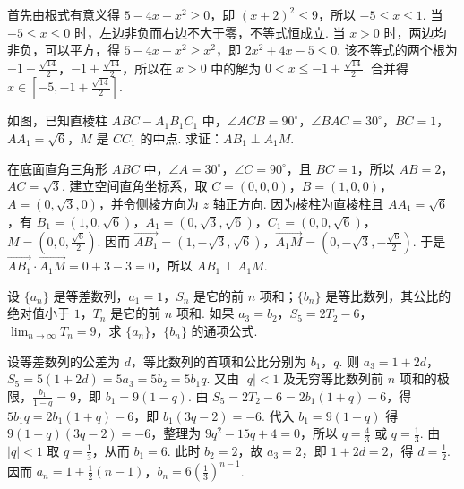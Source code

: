 \documentclass[UTF8,a4paper,oneside,11pt]{ctexbook}
\begin{document}
\begin{solution}
首先由根式有意义得 \(5-4x-x^2\geqslant0\)，即 \((x+2)^2\leqslant9\)，所以 \(-5\leqslant x\leqslant1\). 当 \(-5\leqslant x\leqslant0\) 时，左边非负而右边不大于零，不等式恒成立. 当 \(x>0\) 时，两边均非负，可以平方，得 \(5-4x-x^2\geqslant x^2\)，即 \(2x^2+4x-5\leqslant0\). 该不等式的两个根为 \(-1-\frac{\sqrt{14}}{2}\)，\(-1+\frac{\sqrt{14}}{2}\)，所以在 \(x>0\) 中的解为 \(0<x\leqslant-1+\frac{\sqrt{14}}{2}\). 合并得 \(x\in\left[-5,-1+\frac{\sqrt{14}}{2}\right]\).
\end{solution}

\begin{problem}
如图，已知直棱柱 \(ABC-A_1B_1C_1\) 中，\(\angle ACB=90^{\circ}\)，\(\angle BAC=30^{\circ}\)，\(BC=1\)，\(AA_1=\sqrt{6}\)，\(M\) 是 \(CC_1\) 的中点. 求证：\(AB_1\perp A_1M\).

\end{problem}

\begin{solution}
在底面直角三角形 \(ABC\) 中，\(\angle A=30^{\circ}\)，\(\angle C=90^{\circ}\)，且 \(BC=1\)，所以 \(AB=2\)，\(AC=\sqrt{3}\). 建立空间直角坐标系，取 \(C=(0,0,0)\)，\(B=(1,0,0)\)，\(A=(0,\sqrt{3},0)\)，并令侧棱方向为 \(z\) 轴正方向. 因为棱柱为直棱柱且 \(AA_1=\sqrt{6}\)，有 \(B_1=(1,0,\sqrt{6})\)，\(A_1=(0,\sqrt{3},\sqrt{6})\)，\(C_1=(0,0,\sqrt{6})\)，\(M=\left(0,0,\frac{\sqrt{6}}{2}\right)\). 因而
\(\overrightarrow{AB_1}=(1,-\sqrt{3},\sqrt{6})\)，\(\overrightarrow{A_1M}=\left(0,-\sqrt{3},-\frac{\sqrt{6}}{2}\right)\). 于是 \(\overrightarrow{AB_1}\cdot\overrightarrow{A_1M}=0+3-3=0\)，所以 \(AB_1\perp A_1M\).
\end{solution}

\begin{problem}
设 \(\{a_n\}\) 是等差数列，\(a_1=1\)，\(S_n\) 是它的前 \(n\) 项和；\(\{b_n\}\) 是等比数列，其公比的绝对值小于 \(1\)，\(T_n\) 是它的前 \(n\) 项和. 如果 \(a_3=b_2\)，\(S_5=2T_2-6\)，\(\displaystyle\lim_{n\to\infty} T_n=9\)，求 \(\{a_n\}\)，\(\{b_n\}\) 的通项公式.
\end{problem}

\begin{solution}
设等差数列的公差为 \(d\)，等比数列的首项和公比分别为 \(b_1\)，\(q\). 则 \(a_3=1+2d\)，\(S_5=5(1+2d)=5a_3=5b_2=5b_1q\). 又由 \(\left|q\right|<1\) 及无穷等比数列前 \(n\) 项和的极限，\(\frac{b_1}{1-q}=9\)，即 \(b_1=9(1-q)\). 由 \(S_5=2T_2-6=2b_1(1+q)-6\)，得 \(5b_1q=2b_1(1+q)-6\)，即 \(b_1(3q-2)=-6\). 代入 \(b_1=9(1-q)\) 得 \(9(1-q)(3q-2)=-6\)，整理为 \(9q^2-15q+4=0\)，所以 \(q=\frac{4}{3}\) 或 \(q=\frac{1}{3}\). 由 \(\left|q\right|<1\) 取 \(q=\frac{1}{3}\)，从而 \(b_1=6\). 此时 \(b_2=2\)，故 \(a_3=2\)，即 \(1+2d=2\)，得 \(d=\frac{1}{2}\). 因而 \(a_n=1+\frac{1}{2}(n-1)\)，\(b_n=6\left(\frac{1}{3}\right)^{n-1}\).
\end{solution}
\end{document}
